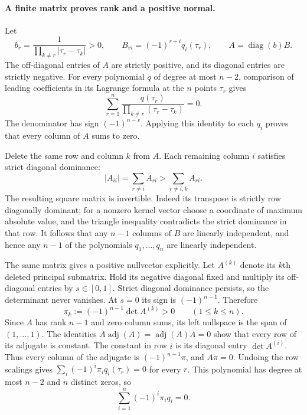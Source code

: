 \documentclass[11pt]{article}
\newcommand{\diag}{\operatorname{diag}}
\theoremstyle{remark}
\numberwithin{equation}{section}
\begin{document}
\paragraph{A finite matrix proves rank and a positive normal.}
\label{polyretry:peak-laplacian}
Let
\[
 b_r=\frac1{\prod_{k\ne r}|\tau_r-\tau_k|}>0,\qquad
 B_{ri}=(-1)^{r+i}q_i(\tau_r),\qquad A=\diag(b)B.
\]
The off-diagonal entries of $A$ are strictly positive, and its
diagonal entries are strictly negative.  For every polynomial
$q$ of degree at most $n-2$, comparison of leading coefficients
in its Lagrange formula at the $n$ points $\tau_r$ gives
\[
 \sum_{r=1}^n
 \frac{q(\tau_r)}{\prod_{k\ne r}(\tau_r-\tau_k)}=0.
\]
The denominator has sign $(-1)^{n-r}$.  Applying this identity
to each $q_i$ proves that every column of $A$ sums to zero.

Delete the same row and column $k$ from $A$.  Each remaining
column $i$ satisfies strict diagonal dominance:
\[
 |A_{ii}|=\sum_{r\ne i}A_{ri}
          >\sum_{r\ne i,k}A_{ri}.
\]
The resulting square matrix is invertible.  Indeed its
transpose is strictly row diagonally dominant; for a nonzero
kernel vector choose a coordinate of maximum absolute value,
and the triangle inequality contradicts the strict dominance
in that row.  It follows that any $n-1$ columns of $B$ are
linearly independent, and hence any $n-1$ of the polynomials
$q_1,\ldots,q_n$ are linearly independent.

The same matrix gives a positive nullvector explicitly.
Let $A^{(k)}$ denote its $k$th deleted principal submatrix.
Hold its negative diagonal fixed and multiply its off-diagonal
entries by $s\in[0,1]$.  Strict diagonal dominance persists,
so the determinant never vanishes.  At $s=0$ its sign is
$(-1)^{n-1}$.  Therefore
\begin{equation}\label{polyretry:laplacian-cofactor}
 \pi_k:=(-1)^{n-1}\det A^{(k)}>0\qquad(1\le k\le n).
\end{equation}
Since $A$ has rank $n-1$ and zero column sums, its left
nullspace is the span of $(1,\ldots,1)$.  The identities
$A\operatorname{adj}(A)=\operatorname{adj}(A)A=0$ show that
every row of its adjugate is constant.  The constant in row
$i$ is its diagonal entry $\det A^{(i)}$.  Thus every column
of the adjugate is $(-1)^{n-1}\pi$, and $A\pi=0$.
Undoing the row scalings gives
$\sum_i(-1)^i\pi_iq_i(\tau_r)=0$ for every $r$.
This polynomial has degree at most $n-2$ and $n$ distinct
zeros, so
\begin{equation}\label{polyretry:positive-q-relation}
 \sum_{i=1}^n(-1)^i\pi_iq_i=0.
\end{equation}
\end{document}
